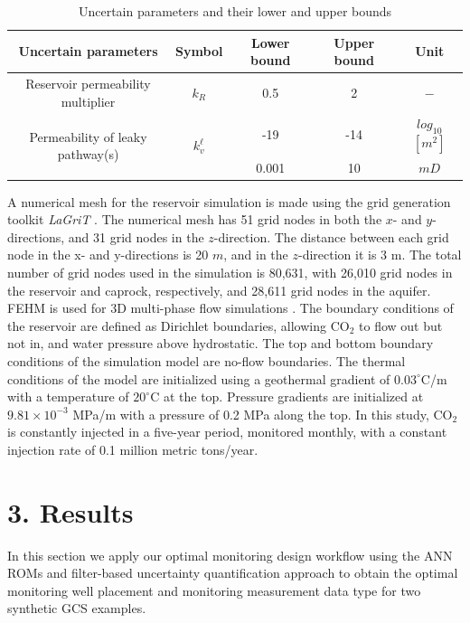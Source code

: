 \documentclass[10pt, twoside]{article}
\begin{document}
\begin{table}
\caption{Uncertain parameters and their lower and upper bounds}
\label{tbl:1}
\begin{center}
\begin{tabular}{ |c|c|c|c|c| } 
\hline
\textbf{Uncertain parameters} & \textbf{Symbol} & \textbf{Lower bound} & \textbf{Upper bound} & \textbf{Unit} \\
\hline \hline
Reservoir permeability multiplier & $k_R$ & 0.5 & 2 & $-$ \\ 
\multirow{2}{*}{Permeability of leaky pathway(s)} & \multirow{2}{*}{$k_v^\ell$} & -19 & -14 & $log_{10}$ $[m^2]$ \\ &  &  0.001 & 10 & $mD$ \\ 
\hline
\end{tabular}
\end{center}
\end{table}

A numerical mesh for the reservoir simulation is made using the grid generation toolkit \textit{LaGriT} \citep{George1999}. The numerical mesh has 51 grid nodes in both the $x$- and $y$-directions, and 31 grid nodes in the $z$-direction. The distance between each grid node in the x- and y-directions is 20 $m$, and in the $z$-direction it is 3 m. The total number of grid nodes used in the simulation is 80,631, with 26,010 grid nodes in the reservoir and caprock, respectively, and 28,611 grid nodes in the aquifer. FEHM is used for 3D multi-phase flow simulations \citep{Zyvoloski1997}. The boundary conditions of the reservoir are defined as Dirichlet boundaries, allowing CO$_2$ to flow out but not in, and water pressure above hydrostatic. The top and bottom boundary conditions of the simulation model are no-flow boundaries. The thermal conditions of the model are initialized using a geothermal gradient of $0.03^\circ$C/m with a temperature of $20^\circ$C at the top. Pressure gradients are initialized at $9.81\times10^{-3}$  MPa/m with a pressure of 0.2 MPa along the top. In this study, CO$_2$ is constantly injected in a five-year period, monitored monthly, with a constant injection rate of 0.1 million metric tons/year.

\section*{\textbf{3. Results}}

In this section we apply our optimal monitoring design workflow using the ANN ROMs and filter-based uncertainty quantification approach to obtain the optimal monitoring well placement and monitoring measurement data type for two synthetic GCS examples.
\end{document}
